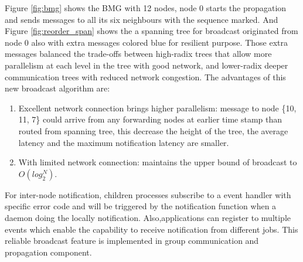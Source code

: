 \documentclass[sigconf]{acmart}
\begin{document}
Figure \ref{fig:bmg} shows the BMG with 12 nodes, node 0 starts the propagation and sends messages to all its six neighbours with the sequence marked. And Figure \ref{fig:reorder_span} shows the a spanning tree for broadcast originated from node 0 also with extra messages colored blue for resilient purpose. Those extra messages balanced the trade-offs between high-radix trees that allow more parallelism at each level in the tree with good network, and lower-radix deeper communication trees with reduced network congestion. The advantages of this new broadcast algorithm are:
\begin{enumerate}
  \item Excellent network connection brings higher parallelism: message to node \{10, 11, 7\} could arrive from any forwarding nodes at earlier time stamp than routed from spanning tree, this decrease the height of the tree, the average latency and the maximum notification latency are smaller.
  \item With limited network connection: maintains the upper bound of broadcast to $O(log_2^{N})$. 
\end{enumerate}
For inter-node notification, children processes subscribe to a event handler with specific error code and will be triggered by the notification function when a daemon doing the locally notification. Also,applications can register to multiple events which enable the capability to receive notification from different jobs. This reliable broadcast feature is implemented in group communication and propagation component.
\end{document}
